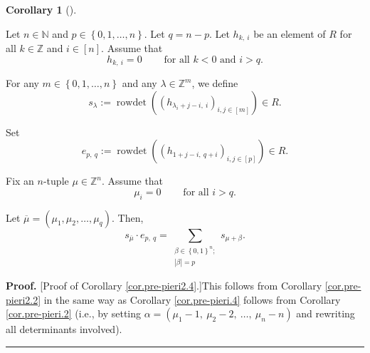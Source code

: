 \documentclass[numbers=enddot,12pt,final,onecolumn,notitlepage,english]{scrartcl}%
\theoremstyle{definition}
\newtheorem{coro}[theo]{Corollary}
\newenvironment{corollary}[1][]
{\begin{coro}[#1]\begin{leftbar}}
{\end{leftbar}\end{coro}}
\newenvironment{proof}[1][Proof]{\noindent\textbf{#1.} }{\ \rule{0.5em}{0.5em}}
\let\sumnonlimits\sum
\renewcommand{\sum}{\sumnonlimits\limits}
\newenvironment{vershort}{}{}
\begin{document}
\begin{corollary}
\label{cor.pre-pieri2.4}Let $n\in\mathbb{N}$ and $p\in\left\{  0,1,\ldots
,n\right\}  $. Let $q=n-p$. Let $h_{k,\ i}$ be an element of $R$ for all
$k\in\mathbb{Z}$ and $i\in\left[  n\right]  $. Assume that%
\begin{equation}
h_{k,\ i}=0\ \ \ \ \ \ \ \ \ \ \text{for all }k<0\text{ and }i>q.
\end{equation}


For any $m\in\left\{  0,1,\ldots,n\right\}  $ and any $\lambda\in
\mathbb{Z}^{m}$, we define%
\[
s_{\lambda}:=\operatorname*{rowdet}\left(  \left(  h_{\lambda_{i}%
+j-i,\ i}\right)  _{i,j\in\left[  m\right]  }\right)  \in R.
\]


Set%
\[
e_{p,\ q}:=\operatorname*{rowdet}\left(  \left(  h_{1+j-i,\ q+i}\right)
_{i,j\in\left[  p\right]  }\right)  \in R.
\]


Fix an $n$-tuple $\mu\in\mathbb{Z}^{n}$. Assume that%
\begin{equation}
\mu_{i}=0\ \ \ \ \ \ \ \ \ \ \text{for all }i>q.
\label{eq.cor.pre-pieri2.4.mui=0}%
\end{equation}


Let $\overline{\mu}=\left(  \mu_{1},\mu_{2},\ldots,\mu_{q}\right)  $. Then,%
\[
s_{\overline{\mu}}\cdot e_{p,\ q}=\sum_{\substack{\beta\in\left\{
0,1\right\}  ^{n};\\\left\vert \beta\right\vert =p}}s_{\mu+\beta}.
\]

\end{corollary}

\begin{vershort}
\begin{proof}
[Proof of Corollary \ref{cor.pre-pieri2.4}.]This follows from Corollary
\ref{cor.pre-pieri2.2} in the same way as Corollary \ref{cor.pre-pieri.4}
follows from Corollary \ref{cor.pre-pieri.2} (i.e., by setting $\alpha=\left(
\mu_{1}-1,\ \mu_{2}-2,\ \ldots,\ \mu_{n}-n\right)  $ and rewriting all
determinants involved).
\end{proof}
\end{vershort}
\end{document}
